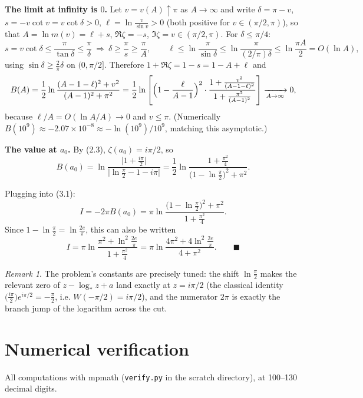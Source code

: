 \documentclass[11pt]{article}
\theoremstyle{remark}
\newtheorem*{remark}{Remark}
\begin{document}
\textbf{The limit at infinity is $0$.} Let $v=v(A)\uparrow\pi$ as $A\to\infty$ and write $\delta=\pi-v$, $s=-v\cot v=v\cot\delta>0$, $\ell=\ln\frac{v}{\sin v}>0$ (both positive for $v\in(\pi/2,\pi)$), so that $A=\ln m(v)=\ell+s$, $\Re\zeta=-s$, $\Im\zeta=v\in(\pi/2,\pi)$. For $\delta\le\pi/4$:
$$s=v\cot\delta\le \frac{\pi}{\tan\delta}\le\frac{\pi}{\delta}\ \Rightarrow\ \delta\ge\frac{\pi}{s}\ge\frac{\pi}{A},
\qquad
\ell\le\ln\frac{\pi}{\sin\delta}\le\ln\frac{\pi}{(2/\pi)\delta}\le\ln\frac{\pi A}{2}=O(\ln A),$$
using $\sin\delta\ge\frac{2}{\pi}\delta$ on $(0,\pi/2]$. Therefore $1+\Re\zeta=1-s=1-A+\ell$ and
$$B(A)=\frac12\ln\frac{(A-1-\ell)^{2}+v^{2}}{(A-1)^{2}+\pi^{2}}
=\frac12\ln\left[\Bigl(1-\frac{\ell}{A-1}\Bigr)^{2}\cdot\frac{1+\frac{v^{2}}{(A-1-\ell)^{2}}}{1+\frac{\pi^{2}}{(A-1)^{2}}}\right]\xrightarrow[A\to\infty]{}0,$$
because $\ell/A=O(\ln A/A)\to0$ and $v\le\pi$. (Numerically $B(10^{9})\approx-2.07\times10^{-8}\approx-\ln(10^{9})/10^{9}$, matching this asymptotic.)

\textbf{The value at $a_0$.} By (2.3), $\zeta(a_0)=i\pi/2$, so
$$B(a_0)=\ln\frac{\bigl|1+\frac{i\pi}{2}\bigr|}{\bigl|\ln\frac\pi2-1-i\pi\bigr|}
=\frac12\ln\frac{1+\frac{\pi^{2}}{4}}{\bigl(1-\ln\frac\pi2\bigr)^{2}+\pi^{2}} .$$

Plugging into (3.1):
$$I=-2\pi B(a_0)=\pi\ln\frac{\bigl(1-\ln\frac{\pi}{2}\bigr)^{2}+\pi^{2}}{1+\frac{\pi^{2}}{4}} .$$
Since $1-\ln\frac{\pi}{2}=\ln\frac{2e}{\pi}$, this can also be written
$$I=\pi\ln\frac{\pi^{2}+\ln^{2}\frac{2e}{\pi}}{1+\frac{\pi^{2}}{4}}
=\pi\ln\frac{4\pi^{2}+4\ln^{2}\frac{2e}{\pi}}{4+\pi^{2}} . \qquad\blacksquare$$

\begin{remark}
The problem's constants are precisely tuned: the shift $\ln\frac\pi2$ makes the relevant zero of $z-\log_*z+a$ land exactly at $z=i\pi/2$ (the classical identity $\bigl(\tfrac{i\pi}{2}\bigr)e^{i\pi/2}=-\tfrac{\pi}{2}$, i.e. $W(-\pi/2)=i\pi/2$), and the numerator $2\pi$ is exactly the branch jump of the logarithm across the cut.
\end{remark}

\section*{Numerical verification}

All computations with mpmath (\texttt{verify.py} in the scratch directory), at 100--130 decimal digits.
\end{document}
